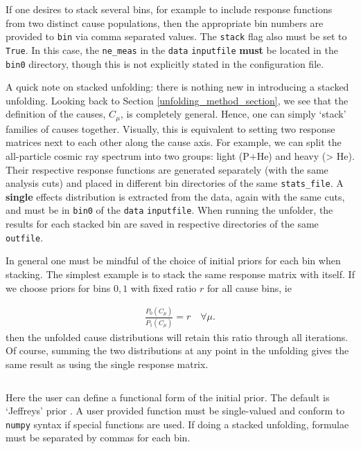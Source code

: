 If one desires to stack several bins, for example to include response functions from two distinct cause populations,
then the appropriate bin numbers are provided to \verb|bin| via comma separated values. The \verb|stack| flag also must be set to \verb|True|.
In this case, the \verb|ne_meas| in the \verb|data| \verb|inputfile| {\bf must} be located in the \verb|bin0| directory, though this is not explicitly
stated in the configuration file.

A quick note on stacked unfolding: there is nothing new in introducing a stacked unfolding. Looking back to Section \ref{unfolding_method_section},
we see that the definition of the causes, $C_{\mu}$, is completely general. Hence, one can simply `stack' families of causes together.
Visually, this is equivalent to setting two response matrices next to each other along the cause axis.
For example, we can split the all-particle cosmic ray spectrum into two groups: light (P+He) and heavy (> He). 
Their respective response functions are generated separately (with the same analysis cuts) and placed in different bin directories of the same \verb|stats_file|.
A {\bf single} effects distribution is extracted from the data, again with the same cuts, and must be in \verb|bin0| of the \verb|data| \verb|inputfile|.
When running the unfolder, the results for each stacked bin are saved in respective directories of the same \verb|outfile|.

In general one must be mindful of the choice of initial priors for each bin when stacking. The simplest example is to stack the same response matrix with itself.
If we choose priors for bins $0,1$ with fixed ratio $r$ for all cause bins, ie

\begin{equation} \label{eq:equalstackedpriors}
 \begin{split}
    \frac{P_{0}(C_{\mu})}{P_{1}(C_{\mu})} = r \quad \forall \mu.
 \end{split}
\end{equation}
then the unfolded cause distributions will retain this ratio through all iterations. 
Of course, summing the two distributions at any point in the unfolding gives the same result as using the single response matrix.


\noindent\hrulefill

\inputminted[firstline=24,lastline=27]{ini}{code/unfoldConfig.cfg}
Here the user can define a functional form of the initial prior.
The default is `Jeffreys' prior \cite{jeffreys}.
A user provided function must be single-valued and conform to \verb|numpy| syntax if special functions are used.
If doing a stacked unfolding, formulae must be separated by commas for each bin.


